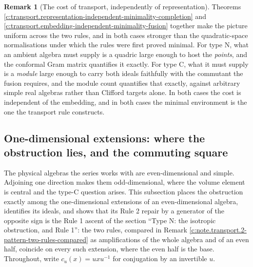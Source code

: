 \documentclass[11pt]{article}
\theoremstyle{definition}
\newtheorem{remark}[theorem]{Remark}
\theoremstyle{plain}
\begin{document}
\begin{remark}[The cost of transport, independently of representation]\label{c:note.transport.cost-transport-independently-representation}
Theorems \ref{c:transport.representation-independent-minimality-completion} and \ref{c:transport.embedding-independent-minimality-fusion} together make the picture uniform across the two rules, and in both cases stronger than the quadratic-space normalisations under which the rules were first proved minimal. For type N, what an ambient algebra must supply is a quadric large enough to host the \emph{points}, and the conformal Gram matrix quantifies it exactly. For type C, what it must supply is a \emph{module} large enough to carry both ideals faithfully with the commutant the fusion requires, and the module count quantifies that exactly, against arbitrary simple real algebras rather than Clifford targets alone. In both cases the cost is independent of the embedding, and in both cases the minimal environment is the one the transport rule constructs.
\end{remark}

\subsection*{One-dimensional extensions: where the obstruction lies, and the commuting square}
\label{c:note.transport.setting-one-dimensional-extensions-where-obstruction}
The physical algebras the series works with are even-dimensional and simple. Adjoining one direction makes them odd-dimensional, where the volume element is central and the type-C question arises. This subsection places the obstruction exactly among the one-dimensional extensions of an even-dimensional algebra, identifies its ideals, and shows that its Rule 2 repair by a generator of the opposite sign is the Rule 1 ascent of the section ``Type N: the isotropic obstruction, and Rule 1'': the two rules, compared in Remark \ref{c:note.transport.2-pattern-two-rules-compared} as amplifications of the whole algebra and of an even half, coincide on every such extension, where the even half is the base. Throughout, write $c_u(x) = u x u^{-1}$ for conjugation by an invertible $u$.
\end{document}
